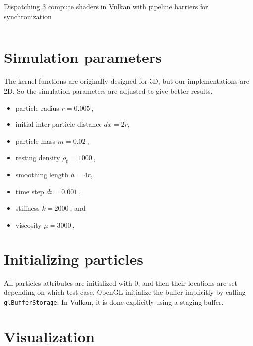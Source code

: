\documentclass[a4paper, 12pt, oneside]{book}
\newenvironment{longlisting}{\captionsetup{type=listing}}{}
\begin{document}
\begin{longlisting}
\caption{Dispatching 3 compute shaders in Vulkan with pipeline barriers for synchronization}
\label{lst:vulkan dispatch}
\inputminted[firstline=1253, lastline=1283]{c++}{code/vulkan.cpp}
\end{longlisting}

\section{Simulation parameters}

\begin{doublespace}
The kernel functions are originally designed for 3D, but our implementations are 2D. So the simulation parameters are adjusted to give better results.
\begin{itemize}
    \item particle radius \(r = \SI{0.005}{}\), %
    \item initial inter-particle distance \(dx = 2 r\),
    \item particle mass \(m = \SI{0.02}{}\), %
    \item resting density \(\rho_0 = \SI{1000}{}\), %
    \item smoothing length \(h = 4 r\),
    \item time step \(dt = \SI{0.001}{}\), %
    \item stiffness \(k = \SI{2000}{}\), and %
    \item viscosity \(\mu = \SI{3000}{}\). %
\end{itemize}
\end{doublespace}

\section{Initializing particles}

\begin{doublespace}
    All particles attributes are initialized with 0, and then their locations are set depending on which test case. OpenGL initialize the buffer implicitly by calling \texttt{glBufferStorage}. In Vulkan, it is done explicitly using a staging buffer. 
\end{doublespace}

\section{Visualization}
\end{document}
